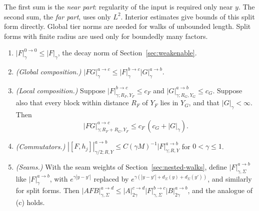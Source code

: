The first sum is the \emph{near part}: regularity of the input is required only near $y$. The second sum, the \emph{far part}, uses only $L^2$. Interior estimates give bounds of this split form directly. Global tier norms are needed for walks of unbounded length. Split forms with finite radius are used only for boundedly many factors.

\begin{lemma}\label{lem:tier-calculus}
\begin{enumerate}[label=(\alph*)]
\item $|F|^{0\to0}_\gamma\le|F|_\gamma$, the decay norm of Section~\ref{sec:weakenable}.
\item \emph{(Global composition.)} $|FG|^{a\to c}_\gamma\le|F|^{b\to c}_\gamma|G|^{a\to b}_\gamma$.
\item \emph{(Local composition.)} Suppose $|F|^{b\to c}_{\gamma;R_F,Y_F}\le c_F$ and $|G|^{a\to b}_{\gamma;R_G,Y_G}\le c_G$. Suppose also that every block within distance $R_F$ of $Y_F$ lies in $Y_G$, and that $|G|_\gamma<\infty$. Then
\[
|FG|^{a\to c}_{\gamma;R_F+R_G,Y_F}\le c_F\,(c_G+|G|_\gamma).
\]
\item \emph{(Commutators.)} $|[F,h_j]|^{a\to b}_{\gamma/2;R,Y}\le C(\gamma M)^{-1}|F|^{a\to b}_{\gamma;R,Y}$ for $0<\gamma\le1$.
\item \emph{(Seams.)} With the seam weights of Section~\ref{sec:nested-walks}, define $|F|^{a\to b}_{\gamma,\Sigma}$ like $|F|^{a\to b}_\gamma$, with $e^{\gamma|y-y'|}$ replaced by $e^{\gamma(|y-y'|+d_\Sigma(y)+d_\Sigma(y'))}$, and similarly for split forms. Then $|AFB|^{a\to d}_{\gamma,\Sigma}\le|A|^{c\to d}_{2\gamma}|F|^{b\to c}_{\gamma,\Sigma}|B|^{a\to b}_{2\gamma}$, and the analogue of (c) holds.
\end{enumerate}
\end{lemma}

